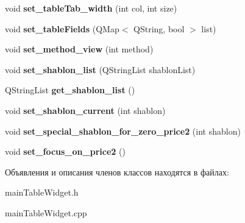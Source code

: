 \begin{DoxyCompactItemize}
\item 
\hypertarget{class_main_table_widget_acc520fb009dd4b052ee9f08105c9f0b4}{void {\bfseries set\-\_\-table\-Tab\-\_\-width} (int col, int size)}\label{class_main_table_widget_acc520fb009dd4b052ee9f08105c9f0b4}

\item 
\hypertarget{class_main_table_widget_acb261c84cc9de033e2c04c48b3537b5d}{void {\bfseries set\-\_\-table\-Fields} (\-Q\-Map$<$ \-Q\-String, bool $>$ list)}\label{class_main_table_widget_acb261c84cc9de033e2c04c48b3537b5d}

\item 
\hypertarget{class_main_table_widget_a13d34e158979dff0d5a19f9b003b3446}{void {\bfseries set\-\_\-method\-\_\-view} (int method)}\label{class_main_table_widget_a13d34e158979dff0d5a19f9b003b3446}

\item 
\hypertarget{class_main_table_widget_a690da39458bdfae9f8cb97dae639b9c2}{void {\bfseries set\-\_\-shablon\-\_\-list} (\-Q\-String\-List shablon\-List)}\label{class_main_table_widget_a690da39458bdfae9f8cb97dae639b9c2}

\item 
\hypertarget{class_main_table_widget_a0d5e1d5cd030c3e9d24b201e37eacb72}{\-Q\-String\-List {\bfseries get\-\_\-shablon\-\_\-list} ()}\label{class_main_table_widget_a0d5e1d5cd030c3e9d24b201e37eacb72}

\item 
\hypertarget{class_main_table_widget_aaea582e45a8dd327eb155a544f9be459}{void {\bfseries set\-\_\-shablon\-\_\-current} (int shablon)}\label{class_main_table_widget_aaea582e45a8dd327eb155a544f9be459}

\item 
\hypertarget{class_main_table_widget_a5cdd24f5c964018d86118f9d4cfb21c0}{void {\bfseries set\-\_\-special\-\_\-shablon\-\_\-for\-\_\-zero\-\_\-price2} (int shablon)}\label{class_main_table_widget_a5cdd24f5c964018d86118f9d4cfb21c0}

\item 
\hypertarget{class_main_table_widget_a51b4c953c3d1be8e8889b7350808edd1}{void {\bfseries set\-\_\-focus\-\_\-on\-\_\-price2} ()}\label{class_main_table_widget_a51b4c953c3d1be8e8889b7350808edd1}

\end{DoxyCompactItemize}


Объявления и описания членов классов находятся в файлах\-:\begin{DoxyCompactItemize}
\item 
main\-Table\-Widget.\-h\item 
main\-Table\-Widget.\-cpp\end{DoxyCompactItemize}
